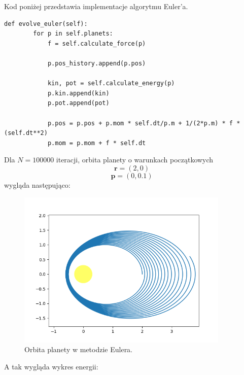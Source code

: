 \documentclass[10pt,a4paper]{article}
\begin{document}
	Kod poniżej przedstawia implementacje algorytmu Euler'a.

\begin{lstlisting}
def evolve_euler(self):
        for p in self.planets:
            f = self.calculate_force(p)

            p.pos_history.append(p.pos)
            
            kin, pot = self.calculate_energy(p)
            p.kin.append(kin)
            p.pot.append(pot)
            
            p.pos = p.pos + p.mom * self.dt/p.m + 1/(2*p.m) * f * (self.dt**2)
            p.mom = p.mom + f * self.dt
\end{lstlisting}

	Dla $N = 100000$ iteracji, orbita planety o warunkach początkowych
	$$ \textbf{r} = (2, 0) $$
	$$ \textbf{p} = (0, 0.1) $$
	wygląda następująco:

	\begin{figure}[htp!!!!!!]	
		\begin{center}
			\includegraphics[width = 0.9\textwidth]{euler_orbit.png}
			\caption{Orbita planety w metodzie Eulera.}
			\label{schemat}
		\end{center}
	\end{figure} 

	A tak wygląda wykres energii:
\end{document}
